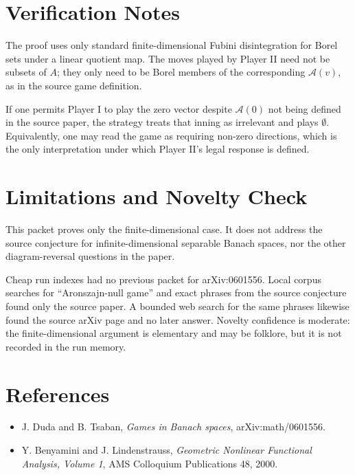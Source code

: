 \documentclass[11pt]{article}
\begin{document}
\section*{Verification Notes}

The proof uses only standard finite-dimensional Fubini disintegration for
Borel sets under a linear quotient map. The moves played by Player II need not
be subsets of \(A\); they only need to be Borel members of the corresponding
\(\mathcal A(v)\), as in the source game definition.

If one permits Player I to play the zero vector despite \(\mathcal A(0)\) not
being defined in the source paper, the strategy treats that inning as
irrelevant and plays \(\emptyset\). Equivalently, one may read the game as
requiring non-zero directions, which is the only interpretation under which
Player II's legal response is defined.

\section*{Limitations and Novelty Check}

This packet proves only the finite-dimensional case. It does not address the
source conjecture for infinite-dimensional separable Banach spaces, nor the
other diagram-reversal questions in the paper.

Cheap run indexes had no previous packet for arXiv:0601556. Local corpus
searches for ``Aronszajn-null game'' and exact phrases from the source
conjecture found only the source paper. A bounded web search for the same
phrases likewise found the source arXiv page and no later answer. Novelty
confidence is moderate: the finite-dimensional argument is elementary and may
be folklore, but it is not recorded in the run memory.

\section*{References}

\begin{itemize}
\item J. Duda and B. Tsaban, \emph{Games in Banach spaces},
arXiv:math/0601556.
\item Y. Benyamini and J. Lindenstrauss, \emph{Geometric Nonlinear Functional
Analysis, Volume 1}, AMS Colloquium Publications 48, 2000.
\end{itemize}
\end{document}
